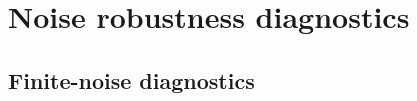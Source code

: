 \documentclass[
  reprint,
  amsmath,
  amssymb,
  aps,
  pra,
  nofootinbib,
  superscriptaddress,
  floatfix
]{revtex4-2}
\begin{document}
\section{Noise robustness diagnostics}
\label{app:noise_selection_robustness}
\label{app:finite_shot_score_robustness}

\subsection{Finite-noise diagnostics}

\end{document}
